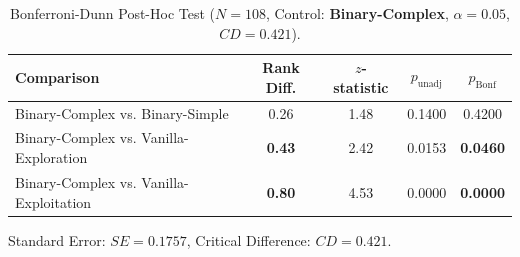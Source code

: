 \begin{table}[htbp]
  \centering
  \small
  \caption{Bonferroni-Dunn Post-Hoc Test ($N=108$, Control: \textbf{Binary-Complex}, $\alpha=0.05$, $CD=0.421$).}
  \label{tab:bonferroni_posthoc_all}
  \begin{tabular}{lcccc}
    \toprule
    \textbf{Comparison} & \textbf{Rank Diff.} & \textbf{$z$-statistic} & \textbf{$p_{\text{unadj}}$} & \textbf{$p_{\text{Bonf}}$} \\
    \midrule
    Binary-Complex vs. Binary-Simple       &   0.26 &  1.48 &  0.1400 &  0.4200 \\
    Binary-Complex vs. Vanilla-Exploration & \textbf{0.43} &  2.42 &  0.0153 & \textbf{0.0460} \\
    Binary-Complex vs. Vanilla-Exploitation & \textbf{0.80} &  4.53 &  0.0000 & \textbf{0.0000} \\
    \bottomrule
  \end{tabular}
  \vspace{1ex}

  \footnotesize Standard Error: $SE=0.1757$, Critical Difference: $CD=0.421$.
\end{table}
